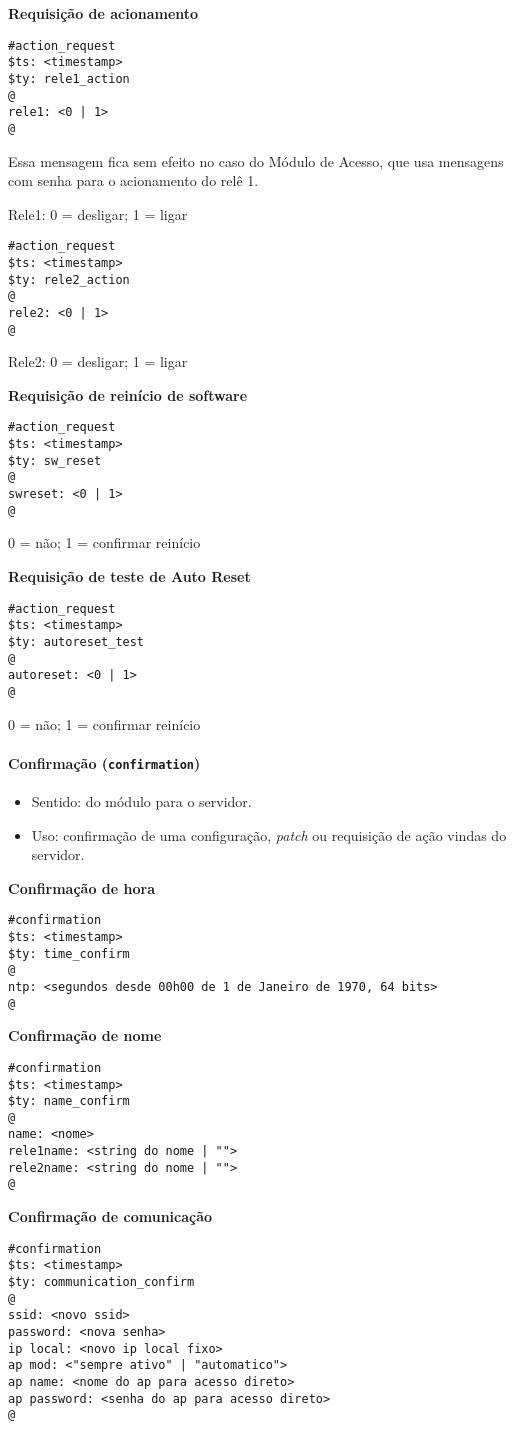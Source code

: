 \textbf{Requisição de acionamento}
\begin{lstlisting}
#action_request
$ts: <timestamp>
$ty: rele1_action
@
rele1: <0 | 1>
@
\end{lstlisting}
Essa mensagem fica sem efeito no caso do Módulo de Acesso, que usa mensagens com senha para o acionamento do relê 1.

Rele1: 0 = desligar; 1 = ligar

\begin{lstlisting}
#action_request
$ts: <timestamp>
$ty: rele2_action
@
rele2: <0 | 1>
@
\end{lstlisting}
Rele2: 0 = desligar; 1 = ligar

\textbf{Requisição de reinício de software}
\begin{lstlisting}
#action_request
$ts: <timestamp>
$ty: sw_reset
@
swreset: <0 | 1>
@
\end{lstlisting}
0 = não; 1 = confirmar reinício

\textbf{Requisição de teste de Auto Reset}
\begin{lstlisting}
#action_request
$ts: <timestamp>
$ty: autoreset_test
@
autoreset: <0 | 1>
@
\end{lstlisting}
0 = não; 1 = confirmar reinício

\paragraph{Confirmação (\texttt{confirmation})}
\begin{itemize}
\item Sentido: do módulo para o servidor.
\item Uso: confirmação de uma configuração, \emph{patch} ou requisição de ação vindas do servidor.
\end{itemize}

\textbf{Confirmação de hora}
\begin{lstlisting}
#confirmation
$ts: <timestamp>
$ty: time_confirm
@
ntp: <segundos desde 00h00 de 1 de Janeiro de 1970, 64 bits>
@
\end{lstlisting}

\textbf{Confirmação de nome}
\begin{lstlisting}
#confirmation
$ts: <timestamp>
$ty: name_confirm
@
name: <nome>
rele1name: <string do nome | "">
rele2name: <string do nome | "">
@
\end{lstlisting}

\textbf{Confirmação de comunicação}
\begin{lstlisting}
#confirmation
$ts: <timestamp>
$ty: communication_confirm
@
ssid: <novo ssid>
password: <nova senha>
ip local: <novo ip local fixo>
ap mod: <"sempre ativo" | "automatico">
ap name: <nome do ap para acesso direto>
ap password: <senha do ap para acesso direto>
@
\end{lstlisting}

